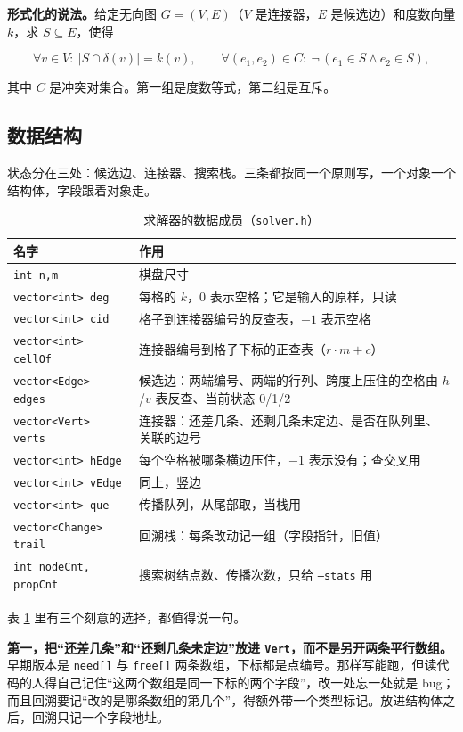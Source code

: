 \documentclass[12pt,a4paper,fontset=windows]{ctexart}
\newcommand{\code}[1]{\texttt{#1}}
\begin{document}
\textbf{形式化的说法。}给定无向图 $G=(V,E)$（$V$ 是连接器，$E$ 是候选边）和度数向量 $k$，求 $S\subseteq E$，使得

\[
  \forall v\in V:\ |S\cap\delta(v)|=k(v),\qquad
  \forall(e_1,e_2)\in C:\ \neg\,(e_1\in S\wedge e_2\in S),
\]

其中 $C$ 是冲突对集合。第一组是度数等式，第二组是互斥。

\subsection{数据结构}

状态分在三处：候选边、连接器、搜索栈。三条都按同一个原则写，一个对象一个结构体，字段跟着对象走。

\begin{table}[htbp]
\centering
\caption{求解器的数据成员（\code{solver.h}）}
\label{tab:struct}
\small
\begin{tabular}{@{}p{4.9cm}p{8.6cm}@{}}
\toprule
\rowcolor{gray!12}名字 & 作用 \\
\midrule
\code{int n,m} & 棋盘尺寸 \\
\code{vector<int> deg} & 每格的 $k$，0 表示空格；它是输入的原样，只读 \\
\code{vector<int> cid} & 格子到连接器编号的反查表，$-1$ 表示空格 \\
\code{vector<int> cellOf} & 连接器编号到格子下标的正查表（$r\cdot m+c$） \\
\code{vector<Edge> edges} & 候选边：两端编号、两端的行列、跨度上压住的空格由 $h$/$v$ 表反查、当前状态 0/1/2 \\
\code{vector<Vert> verts} & 连接器：还差几条、还剩几条未定边、是否在队列里、关联的边号 \\
\code{vector<int> hEdge} & 每个空格被哪条横边压住，$-1$ 表示没有；查交叉用 \\
\code{vector<int> vEdge} & 同上，竖边 \\
\code{vector<int> que} & 传播队列，从尾部取，当栈用 \\
\code{vector<Change> trail} & 回溯栈：每条改动记一组（字段指针，旧值） \\
\code{int nodeCnt, propCnt} & 搜索树结点数、传播次数，只给 \code{--stats} 用 \\
\bottomrule
\end{tabular}
\end{table}

表 \ref{tab:struct} 里有三个刻意的选择，都值得说一句。

\textbf{第一，把“还差几条”和“还剩几条未定边”放进 \code{Vert}，而不是另开两条平行数组。}早期版本是 \code{need[]} 与 \code{free[]} 两条数组，下标都是点编号。那样写能跑，但读代码的人得自己记住“这两个数组是同一下标的两个字段”，改一处忘一处就是 bug；而且回溯要记“改的是哪条数组的第几个”，得额外带一个类型标记。放进结构体之后，回溯只记一个字段地址。
\end{document}
